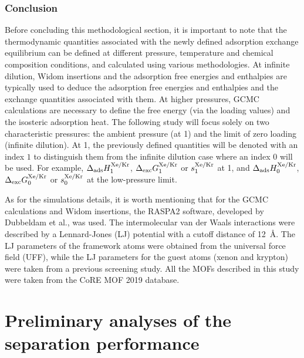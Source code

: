 \documentclass[main.tex]{subfiles}
\begin{document}
\subsubsection{Conclusion}

Before concluding this methodological section, it is important to note that the thermodynamic quantities associated with the newly defined adsorption exchange equilibrium can be defined at different pressure, temperature and chemical composition conditions, and calculated using various methodologies. At infinite dilution, Widom insertions and the adsorption free energies and enthalpies are typically used to deduce the adsorption free energies and enthalpies and the exchange quantities associated with them. At higher pressures, GCMC calculations are necessary to define the free energy (via the loading values) and the isosteric adsorption heat. The following study will focus solely on two characteristic pressures: the ambient pressure (at \SI{1}{\atm}) and the limit of zero loading (infinite dilution). At \SI{1}{\atm}, the previously defined quantities will be denoted with an index $1$ to distinguish them from the infinite dilution case where an index $0$ will be used. For example, $\Delta_{\text{ads}}H_{\text{1}}^{\text{Xe/Kr}}$, $\Delta_{\text{exc}}G_{\text{1}}^{\text{Xe/Kr}}$ or $s_{\text{1}}^{\text{Xe/Kr}}$ at \SI{1}{\atm}, and $\Delta_{\text{ads}}H_{\text{0}}^{\text{Xe/Kr}}$, $\Delta_{\text{exc}}G_{\text{0}}^{\text{Xe/Kr}}$ or $s_{\text{0}}^{\text{Xe/Kr}}$ at the low-pressure limit. 

As for the simulations details, it is worth mentioning that for the GCMC calculations and Widom insertions, the RASPA2 software, developed by Dubbeldam et al.\autocite{dubbeldam2016}, was used. The intermolecular van der Waals interactions were described by a Lennard-Jones (LJ) potential with a cutoff distance of \SI{12}{\angstrom}. The LJ parameters of the framework atoms were obtained from the universal force field (UFF),\autocite{rappe1992} while the LJ parameters for the guest atoms (xenon and krypton) were taken from a previous screening study.\autocite{Ryan_2010} All the MOFs described in this study were taken from the CoRE MOF 2019 database.\autocite{Chung_2019}


\section{Preliminary analyses of the separation performance}
\end{document}
